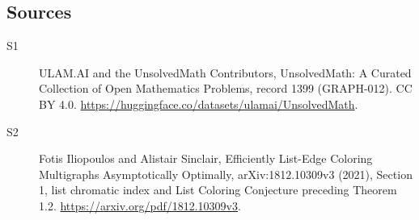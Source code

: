 \documentclass[11pt]{article}
\begin{document}
\subsection{Sources}
\begin{description}
\item[\hypertarget{source:1399:1}{S1}] ULAM.AI and the UnsolvedMath Contributors, UnsolvedMath: A Curated Collection of Open Mathematics Problems, record 1399 (GRAPH-012). CC BY 4.0. \url{https://huggingface.co/datasets/ulamai/UnsolvedMath}.
\item[\hypertarget{source:1399:2}{S2}] Fotis Iliopoulos and Alistair Sinclair, Efficiently List-Edge Coloring Multigraphs Asymptotically Optimally, arXiv:1812.10309v3 (2021), Section 1, list chromatic index and List Coloring Conjecture preceding Theorem 1.2. \url{https://arxiv.org/pdf/1812.10309v3}.
\end{description}
\label{end:1399}
\end{document}
